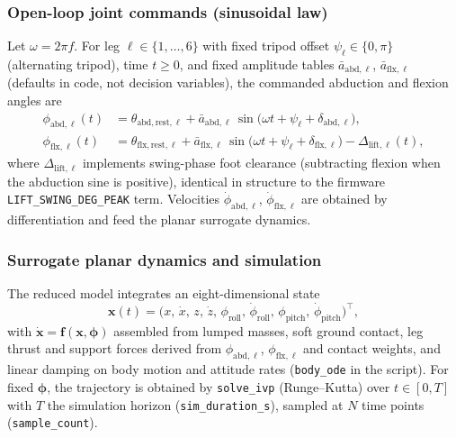 \documentclass[11pt]{article}
\begin{document}
\subsubsection{Open-loop joint commands (sinusoidal law)}
Let $\omega=2\pi f$. For leg $\ell\in\{1,\ldots,6\}$ with fixed tripod offset $\psi_\ell\in\{0,\pi\}$ (alternating tripod), time $t\ge 0$, and fixed amplitude tables $\bar{a}_{\mathrm{abd},\ell}$, $\bar{a}_{\mathrm{flx},\ell}$ (defaults in code, not decision variables), the commanded abduction and flexion angles are
\begin{align}
  \phi_{\mathrm{abd},\ell}(t) &= \theta_{\mathrm{abd,rest},\ell}
    + \bar{a}_{\mathrm{abd},\ell}\,
      \sin\!\bigl(\omega t + \psi_\ell + \delta_{\mathrm{abd},\ell}\bigr), \\
  \phi_{\mathrm{flx},\ell}(t) &= \theta_{\mathrm{flx,rest},\ell}
    + \bar{a}_{\mathrm{flx},\ell}\,
      \sin\!\bigl(\omega t + \psi_\ell + \delta_{\mathrm{flx},\ell}\bigr)
    - \Delta_{\mathrm{lift},\ell}(t),
\end{align}
where $\Delta_{\mathrm{lift},\ell}$ implements swing-phase foot clearance (subtracting flexion when the abduction sine is positive), identical in structure to the firmware \texttt{LIFT\_SWING\_DEG\_PEAK} term. Velocities $\dot{\phi}_{\mathrm{abd},\ell}$, $\dot{\phi}_{\mathrm{flx},\ell}$ are obtained by differentiation and feed the planar surrogate dynamics.

\subsubsection{Surrogate planar dynamics and simulation}
The reduced model integrates an eight-dimensional state
\begin{equation}
  \mathbf{x}(t) =
  \bigl(x,\,\dot{x},\,z,\,\dot{z},\,\phi_{\mathrm{roll}},\,\dot{\phi}_{\mathrm{roll}},\,\phi_{\mathrm{pitch}},\,\dot{\phi}_{\mathrm{pitch}}\bigr)^{\top},
\end{equation}
with $\dot{\mathbf{x}}=\mathbf{f}(\mathbf{x},\boldsymbol{\phi})$ assembled from lumped masses, soft ground contact, leg thrust and support forces derived from $\phi_{\mathrm{abd},\ell}$, $\phi_{\mathrm{flx},\ell}$ and contact weights, and linear damping on body motion and attitude rates (\texttt{body\_ode} in the script). For fixed $\boldsymbol{\phi}$, the trajectory is obtained by \texttt{solve\_ivp} (Runge--Kutta) over $t\in[0,T]$ with $T$ the simulation horizon (\texttt{sim\_duration\_s}), sampled at $N$ time points (\texttt{sample\_count}).
\end{document}
